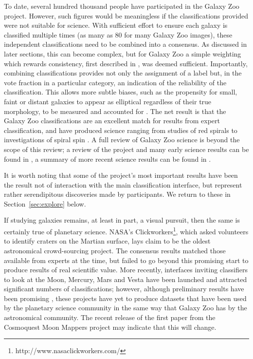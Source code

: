\documentclass{ar2e}
\def\Sref#1{Section~\ref{#1}\xspace}
\def\CaseStudy#1{\noindent{\it\bf #1 \,\,\,\,}}
\begin{document}
To date, several hundred thousand people 
have participated in the Galaxy Zoo project. However, such
figures would be meaningless if the classifications provided were not suitable
for science. With sufficient effort to ensure each galaxy is classified multiple
times (as many as 80 for many Galaxy Zoo images), these independent
classifications need to be combined into a consensus. As discussed in later
sections, this can become complex, but for Galaxy Zoo a simple weighting which
rewards consistency, first described in \citet{Land++2008}, was deemed sufficient.
Importantly, combining classifications provides not only the assignment of a
label but, in the vote fraction in a particular category, an indication of the
reliability of the classification. This allows more subtle biases, such as the
propensity for small, faint or distant galaxies to appear as elliptical
regardless of their true morphology, to be measured and accounted for
\citep[see][]{Bamford++2009}. The net result is that the Galaxy Zoo classifications
are an excellent match for results from expert classification, and have produced
science ranging from studies of red spirals \citep{Masters++2010} to investigations
of spiral spin \citep{Slosar++2009}.
A full review of Galaxy Zoo science is beyond the scope of this review; a review
of the project and many early science results can be found in
\citet{Fortson++2012}, a summary of more recent science results can be found in
\citet{Willett++2013}.


It is worth noting that some of the project's most important results
have been the result not of interaction with the main classification interface,
but represent rather serendipitous discoveries made by participants. 
We return to these in \Sref{sec:explore} below.



\CaseStudy{Surfaces of solar system bodies: Moon Zoo, Moonwatch.}
If studying galaxies remains, at least in part, a visual pursuit, then the same
is certainly true of planetary science. NASA's Clickworkers\footnote{http://www.nasaclickworkers.com/}, which asked
volunteers to identify craters on the Martian surface, lays claim to be the
oldest astronomical crowd-sourcing project. The consensus results matched those
available from experts at the time, but failed to go beyond this promising start
to produce results of real scientific value. More recently, interfaces inviting
classifiers to look at the Moon, Mercury, Mars and Vesta have been launched and
attracted significant numbers of classifications; however, although preliminary
results have been promising \citep{Kanefsky}, these projects have yet to produce datasets that
have been used by the planetary science community in the same way that Galaxy
Zoo has by the astronomical community. The recent release of the first paper from the Cosmoquest
Moon Mappers project \citep{Robbins} may indicate that this will change. 
\end{document}
